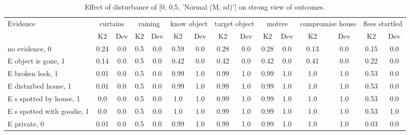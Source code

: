 \begin{table}\begin{tabular}{l|cc|cc|cc|cc|cc|cc|cc}\toprule\multirow{2}{*}{Evidence} & \multicolumn{2}{c}{curtains}& \multicolumn{2}{c}{raining}& \multicolumn{2}{c}{know object}& \multicolumn{2}{c}{target object}& \multicolumn{2}{c}{motive}& \multicolumn{2}{c}{compromise house}& \multicolumn{2}{c}{flees startled}\\& {K2} & {Dev}& {K2} & {Dev}& {K2} & {Dev}& {K2} & {Dev}& {K2} & {Dev}& {K2} & {Dev}& {K2} & {Dev}\\\midrule
no evidence, 0 & \cellcolor{Bittersweet}0.24&\cellcolor{Bittersweet}0.0&0.5&0.0&\cellcolor{Bittersweet}0.59&\cellcolor{Bittersweet}0.0&\cellcolor{Bittersweet}0.28&\cellcolor{Bittersweet}0.0&\cellcolor{Bittersweet}0.28&\cellcolor{Bittersweet}0.0&\cellcolor{Bittersweet}0.13&\cellcolor{Bittersweet}0.0&\cellcolor{Bittersweet}0.15&\cellcolor{Bittersweet}0.0\\E object is gone, 1 & \cellcolor{Bittersweet}0.14&\cellcolor{Bittersweet}0.0&0.5&0.0&0.42&0.0&0.42&0.0&0.42&0.0&0.41&0.0&\cellcolor{Bittersweet}0.22&\cellcolor{Bittersweet}0.0\\E broken lock, 1 & \cellcolor{Bittersweet}0.01&\cellcolor{Bittersweet}0.0&0.5&0.0&\cellcolor{Bittersweet}0.99&\cellcolor{Bittersweet}1.0&\cellcolor{Bittersweet}0.99&\cellcolor{Bittersweet}1.0&\cellcolor{Bittersweet}0.99&\cellcolor{Bittersweet}1.0&\cellcolor{Bittersweet}1.0&\cellcolor{Bittersweet}1.0&\cellcolor{Bittersweet}0.53&\cellcolor{Bittersweet}0.0\\E disturbed house, 1 & \cellcolor{Bittersweet}0.01&\cellcolor{Bittersweet}0.0&0.5&0.0&\cellcolor{Bittersweet}0.99&\cellcolor{Bittersweet}1.0&\cellcolor{Bittersweet}0.99&\cellcolor{Bittersweet}1.0&\cellcolor{Bittersweet}0.99&\cellcolor{Bittersweet}1.0&\cellcolor{Bittersweet}1.0&\cellcolor{Bittersweet}1.0&0.53&0.0\\E s spotted by house, 1 & \cellcolor{Bittersweet}0.0&\cellcolor{Bittersweet}0.0&0.5&0.0&\cellcolor{Bittersweet}1.0&\cellcolor{Bittersweet}1.0&\cellcolor{Bittersweet}0.99&\cellcolor{Bittersweet}1.0&\cellcolor{Bittersweet}0.99&\cellcolor{Bittersweet}1.0&\cellcolor{Bittersweet}1.0&\cellcolor{Bittersweet}1.0&0.53&0.0\\E s spotted with goodie, 1 & \cellcolor{Bittersweet}0.0&\cellcolor{Bittersweet}0.0&0.5&0.0&\cellcolor{Bittersweet}1.0&\cellcolor{Bittersweet}1.0&\cellcolor{Bittersweet}0.99&\cellcolor{Bittersweet}1.0&\cellcolor{Bittersweet}0.99&\cellcolor{Bittersweet}1.0&\cellcolor{Bittersweet}1.0&\cellcolor{Bittersweet}1.0&0.53&1.0\\E private, 0 & \cellcolor{Bittersweet}0.01&\cellcolor{Bittersweet}0.0&0.5&0.0&\cellcolor{Bittersweet}0.99&\cellcolor{Bittersweet}1.0&\cellcolor{Bittersweet}0.99&\cellcolor{Bittersweet}1.0&\cellcolor{Bittersweet}0.99&\cellcolor{Bittersweet}1.0&\cellcolor{Bittersweet}1.0&\cellcolor{Bittersweet}1.0&\cellcolor{Bittersweet}0.03&\cellcolor{Bittersweet}0.0\\\bottomrule\end{tabular}\caption{Effect of disturbance of [0, 0.5, 'Normal (M, sd)'] on strong view of outcomes.}\end{table}
